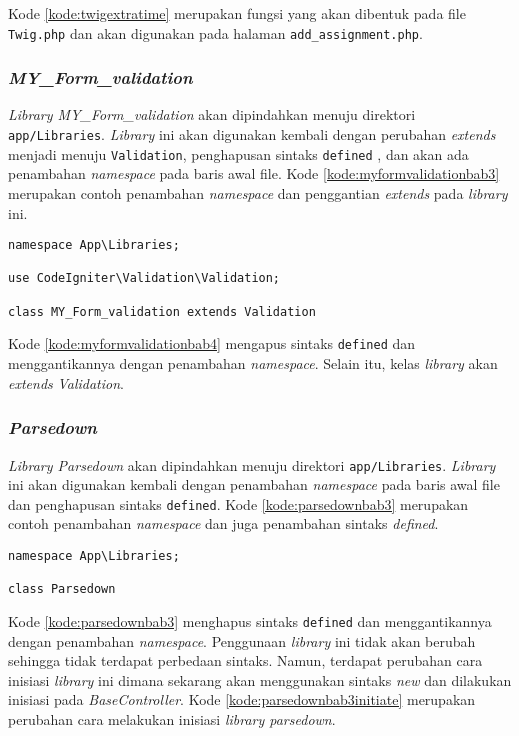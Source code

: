 Kode \ref{kode:twigextratime} merupakan fungsi yang akan dibentuk pada file \texttt{Twig.php} dan akan digunakan pada halaman \texttt{add\_assignment.php}.

\subsubsection{\textit{MY\_Form\_validation}}
\textit{Library MY\_Form\_validation} akan dipindahkan menuju direktori \texttt{app/Libraries}. \textit{Library} ini akan digunakan kembali dengan perubahan \textit{extends} menjadi menuju \texttt{Validation}, penghapusan sintaks \texttt{defined} , dan akan ada penambahan \textit{namespace} pada baris awal file. Kode \ref{kode:myformvalidationbab3} merupakan contoh penambahan \textit{namespace} dan penggantian \textit{extends} pada \textit{library} ini.
\begin{lstlisting}[caption=Contoh perubahan \textit{library MY\_Form\_validation} pada \textit{CodeIgniter 4}, label=kode:myformvalidationbab4]
namespace App\Libraries;

use CodeIgniter\Validation\Validation;

class MY_Form_validation extends Validation
\end{lstlisting}
Kode \ref{kode:myformvalidationbab4} mengapus sintaks \texttt{defined} dan menggantikannya dengan penambahan \textit{namespace}. Selain itu, kelas \textit{library} akan \textit{extends} \textit{Validation}. 

\subsubsection{\textit{Parsedown}}
\textit{Library Parsedown} akan dipindahkan menuju direktori \texttt{app/Libraries}. \textit{Library} ini akan digunakan kembali dengan penambahan \textit{namespace} pada baris awal file dan penghapusan sintaks \texttt{defined}.  Kode \ref{kode:parsedownbab3} merupakan contoh penambahan \textit{namespace} dan juga penambahan sintaks \textit{defined}.
\begin{lstlisting}[caption=Perancangan perubahan \textit{library Parsedown} pada \textit{CodeIgniter 4}, label=kode:parsedownbab3]
namespace App\Libraries;

class Parsedown
\end{lstlisting}
Kode \ref{kode:parsedownbab3} menghapus sintaks \texttt{defined} dan menggantikannya dengan penambahan \textit{namespace}. Penggunaan \textit{library} ini tidak akan berubah sehingga tidak terdapat perbedaan sintaks. Namun, terdapat perubahan cara inisiasi \textit{library} ini dimana sekarang akan menggunakan sintaks \textit{new} dan dilakukan inisiasi pada \textit{BaseController}. Kode \ref{kode:parsedownbab3initiate} merupakan perubahan cara melakukan inisiasi \textit{library parsedown}.

